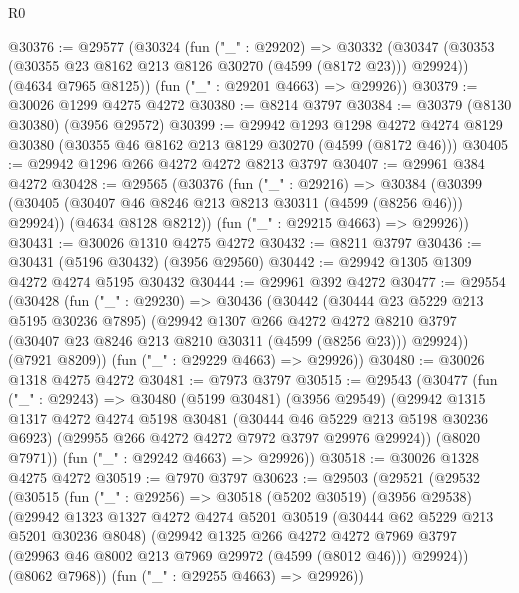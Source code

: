 \begin{lexlean}{R0}
\begin{coremodule}
@30376 := @29577
    (@30324
      (fun ("_" : @29202) =>
      @30332
        (@30347 (@30353 (@30355 @23 @8162 @213 @8126 @30270 (@4599 (@8172 @23))) @29924))
        (@4634 @7965 @8125))
      (fun ("_" : @29201 @4663) => @29926))
@30379 := @30026 @1299 @4275 @4272
@30380 := @8214 @3797
@30384 := @30379 (@8130 @30380) (@3956 @29572)
@30399 := @29942
    @1293
    @1298
    @4272
    @4274
    @8129
    @30380
    (@30355 @46 @8162 @213 @8129 @30270 (@4599 (@8172 @46)))
@30405 := @29942 @1296 @266 @4272 @4272 @8213 @3797
@30407 := @29961 @384 @4272
@30428 := @29565
    (@30376
      (fun ("_" : @29216) =>
      @30384
        (@30399 (@30405 (@30407 @46 @8246 @213 @8213 @30311 (@4599 (@8256 @46))) @29924))
        (@4634 @8128 @8212))
      (fun ("_" : @29215 @4663) => @29926))
@30431 := @30026 @1310 @4275 @4272
@30432 := @8211 @3797
@30436 := @30431 (@5196 @30432) (@3956 @29560)
@30442 := @29942 @1305 @1309 @4272 @4274 @5195 @30432
@30444 := @29961 @392 @4272
@30477 := @29554
    (@30428
      (fun ("_" : @29230) =>
      @30436
        (@30442
          (@30444 @23 @5229 @213 @5195 @30236 @7895)
          (@29942
            @1307
            @266
            @4272
            @4272
            @8210
            @3797
            (@30407 @23 @8246 @213 @8210 @30311 (@4599 (@8256 @23)))
            @29924))
        (@7921 @8209))
      (fun ("_" : @29229 @4663) => @29926))
@30480 := @30026 @1318 @4275 @4272
@30481 := @7973 @3797
@30515 := @29543
    (@30477
      (fun ("_" : @29243) =>
      @30480
        (@5199 @30481)
        (@3956 @29549)
        (@29942
          @1315
          @1317
          @4272
          @4274
          @5198
          @30481
          (@30444 @46 @5229 @213 @5198 @30236 @6923)
          (@29955 @266 @4272 @4272 @7972 @3797 @29976 @29924))
        (@8020 @7971))
      (fun ("_" : @29242 @4663) => @29926))
@30518 := @30026 @1328 @4275 @4272
@30519 := @7970 @3797
@30623 := @29503
    (@29521
      (@29532
        (@30515
          (fun ("_" : @29256) =>
          @30518
            (@5202 @30519)
            (@3956 @29538)
            (@29942
              @1323
              @1327
              @4272
              @4274
              @5201
              @30519
              (@30444 @62 @5229 @213 @5201 @30236 @8048)
              (@29942
                @1325
                @266
                @4272
                @4272
                @7969
                @3797
                (@29963 @46 @8002 @213 @7969 @29972 (@4599 (@8012 @46)))
                @29924))
            (@8062 @7968))
          (fun ("_" : @29255 @4663) => @29926))

\end{coremodule}
\end{lexlean}

